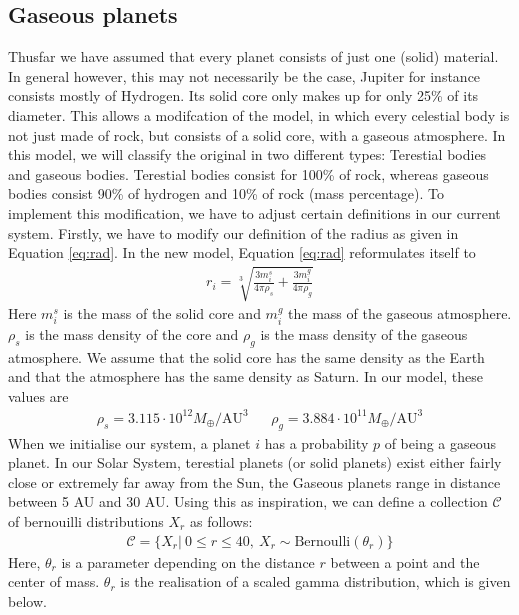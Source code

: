 \subsection{Gaseous planets}
Thusfar we have assumed that every planet consists of just one (solid) material. 
In general however, this may not necessarily be the case, Jupiter for instance consists mostly of Hydrogen. Its solid core only makes up for only 25\% of its diameter.
This allows a modifcation of the model, in which every celestial body is not just made of rock, but consists of a solid core, with a gaseous atmosphere. 
In this model, we will classify the original in two different types: Terestial bodies and gaseous bodies.
 Terestial bodies consist for 100\% of rock, whereas gaseous bodies consist 90\% of hydrogen and 10\% of rock (mass percentage). To implement this modification, we have to adjust certain definitions in our current system. Firstly, we have to modify our definition of the radius as given in Equation \eqref{eq:rad}. In the new model, Equation \eqref{eq:rad} reformulates itself to
 \begin{align*}
 r_i=\sqrt[3]{\frac{3 m_i^s}{4\pi \rho_s}+\frac{3 m_i^g}{4\pi \rho_g}}
 \end{align*}
 Here \(m_i^s\) is the mass of the solid core and \(m_i^g\) the mass of the gaseous atmosphere. \(\rho_s\) is the mass density of the core and \(\rho_g\) is the mass density of the gaseous atmosphere. 
 We assume that the solid core has the same density as the Earth and that the atmosphere has the same density as Saturn. 
 In our model, these values are 
 \begin{align*}
 \rho_s =3.115\cdot 10^{12}{M_{\oplus}}/{\text{AU}^3} && \rho_g = 3.884\cdot 10^{11}{M_{\oplus}}/{\text{AU}^3}
 \end{align*}
When we initialise our system, a planet \(i\) has a probability \(p\) of being a gaseous planet. 
In our Solar System, terestial planets (or solid planets) exist either fairly close or extremely far away from the Sun, the Gaseous planets range in distance between 5 AU and 30 AU. 
Using this as inspiration, we can define a collection \(\mathcal{C}\) of bernouilli distributions \(X_r\) as follows:
\begin{align*}
	\mathcal{C}=\{X_r| ~0\leq r \leq 40,~X_r \sim \mbox{Bernoulli}(\theta_r)\}
\end{align*}
Here, \(\theta_r\) is a parameter depending on the distance \(r\) between a point and the center of mass. \(\theta_r\)  is the realisation of a scaled gamma distribution, which is given below.

